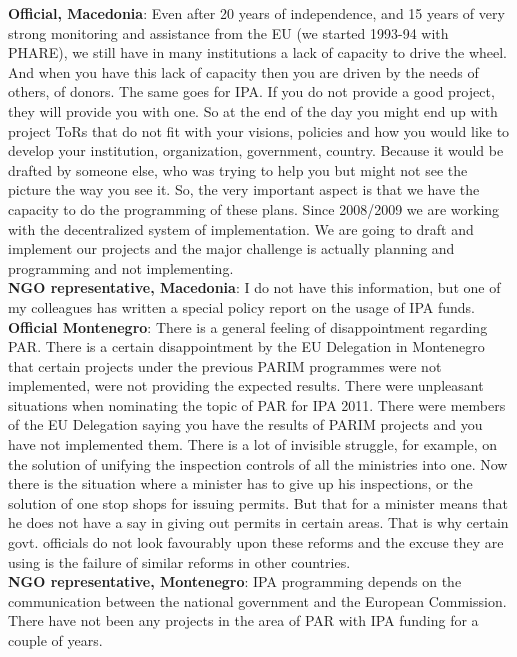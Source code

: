 \textbf{Official, Macedonia}: Even after 20 years of independence, and 15 years of very strong monitoring and assistance from the EU (we started 1993-94 with PHARE), we still have in many institutions a lack of capacity to drive the wheel. And when you have this lack of capacity then you are driven by the needs of others, of donors. The same goes for IPA. If you do not provide a good project, they will provide you with one. So at the end of the day you might end up with project ToRs that do not fit with your visions, policies and how you would like to develop your institution, organization, government, country. Because it would be drafted by someone else, who was trying to help you but might not see the picture the way you see it. So, the very important aspect is that we have the capacity to do the programming of these plans. Since 2008/2009 we are working with the decentralized system of implementation. We are going to draft and implement our projects and the major challenge is actually planning and programming and not implementing.\\
\textbf{NGO representative, Macedonia}: I do not have this information, but one of my colleagues has written a special policy report on the usage of IPA funds.  \\
\textbf{Official Montenegro}: There is a general feeling of disappointment regarding  PAR. There is a certain disappointment by the EU Delegation in Montenegro that certain projects under the previous PARIM programmes were not implemented, were not providing the expected results. There were unpleasant situations when nominating the topic of PAR for IPA 2011. There were members of the EU Delegation saying you have the results of PARIM projects and you have not implemented them. There is a lot of invisible struggle, for example, on the solution of unifying the inspection controls of all the ministries into one. Now there is the situation where a minister has to give up his inspections, or the solution of one stop shops for issuing permits. But that for a minister means that he does not have a say in giving out permits in certain areas. That is why certain govt. officials do not look favourably upon these reforms and the excuse they are using is the failure of similar reforms in other countries.\\
\textbf{NGO representative, Montenegro}: IPA programming depends on the communication between the national government and the European Commission. There have not been any projects in the area of PAR with IPA funding for a couple of years.%

